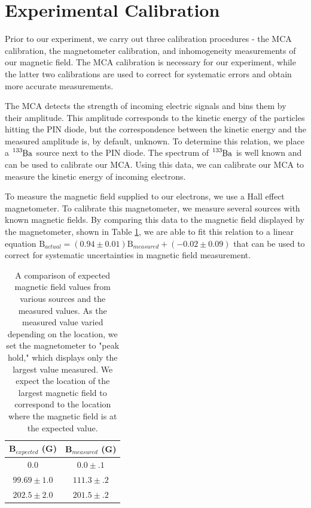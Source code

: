 \section{Experimental Calibration}
Prior to our experiment, we carry out three calibration procedures - the MCA calibration, the magnetometer calibration, and inhomogeneity measurements of our magnetic field. The MCA calibration is necessary for our experiment, while the latter two calibrations are used to correct for systematic errors and obtain more accurate measurements.

The MCA detects the strength of incoming electric signals and bins them by their amplitude. This amplitude corresponds to the kinetic energy of the particles hitting the PIN diode, but the correspondence between the kinetic energy and the measured amplitude is, by default, unknown. To determine this relation, we place a $\tensor*[^{133}]{\text{Ba}}{}$ source next to the PIN diode. The spectrum of $\tensor*[^{133}]{\text{Ba}}{}$ is well known and can be used to calibrate our MCA. %
Using this data, we can calibrate our MCA to measure the kinetic energy of incoming electrons. 

To measure the magnetic field supplied to our electrons, we use a Hall effect magnetometer. To calibrate this magnetometer, we measure several sources with known magnetic fields. By comparing this data to the magnetic field displayed by the magnetometer, shown in Table \ref{magnetometer}, we are able to fit this relation to a linear equation $\text{B}_{actual} = (0.94 \pm 0.01)\text{B}_{measured} + (-0.02 \pm 0.09)$ that can be used to correct for systematic uncertainties in magnetic field measurement. 
\begin{table}[h]
  \caption{A comparison of expected magnetic field values from various sources and the measured values. As the measured value varied depending on the location, we set the magnetometer to "peak hold," which displays only the largest value measured. We expect the location of the largest magnetic field to correspond to the location where the magnetic field is at the expected value.}
\begin{tabular}{||c c||}
  \hline
      B$_{expected}$ (G)&B$_{measured}$ (G)\\
      \hline
      \hline
      $0.0$ & $0.0 \pm .1$ \\
      \hline
      $99.69 \pm 1.0$ & $111.3 \pm .2$ \\
      \hline
      $202.5 \pm 2.0$ & $201.5 \pm .2$ \\
      \hline
    \end{tabular}
  \label{magnetometer}
\end{table}

